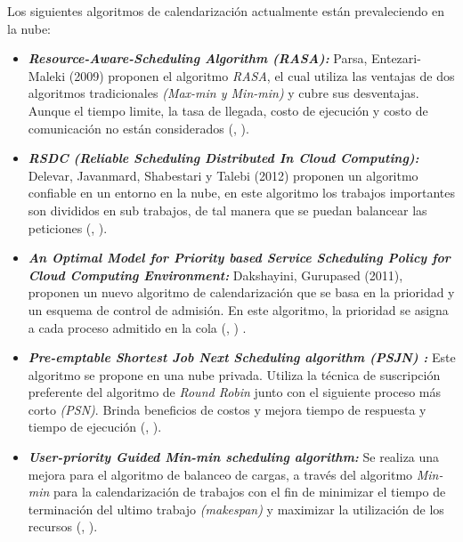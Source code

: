 Los siguientes algoritmos de calendarizaci\'on actualmente est\'an prevaleciendo en la nube:
\begin{itemize}
	\item \textit{\textbf{Resource-Aware-Scheduling Algorithm (RASA):}} Parsa, Entezari-Maleki (2009) proponen el algoritmo \textit{RASA}, el cual utiliza las ventajas de dos algoritmos tradicionales \textit{(Max-min y Min-min)} y cubre sus desventajas. Aunque el tiempo limite, la tasa de llegada, costo de ejecución y costo de comunicaci\'on no est\'an considerados (\citeauthor{parsa2009rasa}, \citeyear{parsa2009rasa}).
	
	
	\item \textit{\textbf{RSDC (Reliable Scheduling Distributed In Cloud Computing):}} Delevar, Javanmard, Shabestari y Talebi (2012) proponen un algoritmo confiable en un entorno en la nube, en este algoritmo los trabajos importantes son divididos en sub trabajos, de tal manera que se puedan balancear las peticiones (\citeauthor{delavar2012rsdc}, \citeyear{delavar2012rsdc}).
	
	
	\item \textit{\textbf{An Optimal Model for Priority based Service Scheduling Policy for Cloud Computing Environment:}} Dakshayini, Gurupased (2011), proponen un nuevo algoritmo de calendarizaci\'on que se basa en la prioridad y un esquema de control de admisi\'on. En este algoritmo, la prioridad se asigna a cada proceso admitido en la cola (\citeauthor{dakshayini2011optimal}, \citeyear{dakshayini2011optimal}) . 
	
	
	\item \textit{\textbf{Pre-emptable Shortest Job Next Scheduling algorithm (PSJN) :}}  Este algoritmo se propone en una nube privada. Utiliza la t\'ecnica de suscripci\'on preferente del algoritmo de \textit{Round Robin} junto con el siguiente proceso m\'as corto \textit{(PSN)}. Brinda beneficios de costos y mejora tiempo de respuesta y tiempo de ejecuci\'on (\citeauthor{nishant}, \citeyear{nishant}). 
	
	
	\item \textit{\textbf{User-priority Guided Min-min scheduling algorithm:}} Se realiza una mejora para el algoritmo de balanceo de cargas, a trav\'es del algoritmo \textit{Min-min} para la calendarizaci\'on de trabajos con el fin de minimizar el tiempo de terminaci\'on del ultimo trabajo \textit{(makespan)} y maximizar la utilizaci\'on de los recursos (\citeauthor{chen2013user}, \citeyear{chen2013user}). 
\end{itemize}



